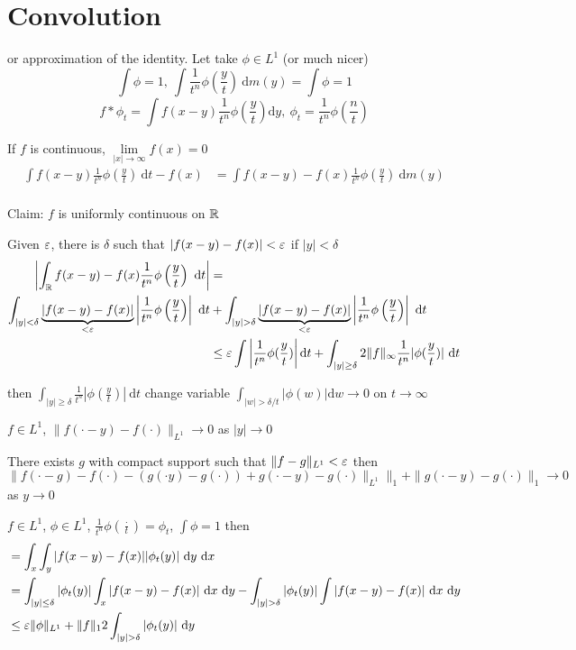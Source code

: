 \section{Convolution}
or approximation of the identity.
Let take $\phi \in L^1$ (or much nicer)
\[\int \phi = 1,\ \int \frac1{t^n}\phi\left(\frac yt\right) \ \mathrm{d}m(y) = \int \phi = 1\]
\[f * \phi_t = \int f(x-y) \frac1{t^n}\phi\left(\frac yt\right) \mathrm{d}y,\ \phi_t = \frac1{t^n} \phi\left(\frac nt\right)\]

If $f$ is continuous, $\lim\limits_{|x|\to\infty} f(x) = 0$
\begin{align*}
  \int f(x-y) \frac{1}{t^n} \phi\left(\frac yt\right) \ \mathrm{d}t - f(x) &= \int f(x-y) - f(x) \frac1{t^n} \phi\left(\frac yt\right) \ \mathrm{d}m(y) \\
\end{align*}

Claim: $f$ is uniformly continuous on $\mathbb R$

Given $\varepsilon$, there is $\delta$ such that $|f(x-y) - f(x)| < \varepsilon$ if $|y| < \delta$
\begin{align*}
  \left|\int_\mathbb R f(x-y) - f(x) \frac1{t^n} \phi\left(\frac yt\right) \ \mathrm{d}t\right| &= \\
  \int_{|y| < \delta} \underbrace{|f(x-y) - f(x)|}_{< \varepsilon} \left|\frac1{t^n} \phi\left(\frac yt\right)\right| \ \mathrm{d}t& + \int_{|y| > \delta} \underbrace{|f(x-y) - f(x)|}_{< \varepsilon} \left|\frac1{t^n} \phi\left(\frac yt\right)\right| \ \mathrm{d}t\\
  &\le \varepsilon \int \left|\frac1{t^n} \phi(\frac yt)\right| \mathrm{d}t + \int_{|y| \ge \delta} 2 \|f\|_{\infty} \frac{1}{t^n} |\phi(\frac yt)| \ \mathrm{d}t \\
\end{align*}

then $\int_{|y| \ge \delta} \frac1{t^n} |\phi(\frac yt)| \ \mathrm{d}t$ change variable
$\int_{|w| > \delta /t} |\phi(w)| \mathrm{d}w \to 0$ on $t \to \infty$

$f \in L^1$, $\|f(\cdot - y) - f(\cdot)\|_{L^1} \to 0$ as $|y| \to 0$

There exists $g$ with compact support such that $\|f-g\|_{L^1} < \varepsilon$
then 
\[\|f(\cdot - g) - f(\cdot) -(g(\cdot y) - g(\cdot)) + g(\cdot -y) - g(\cdot)\|_{L^1}\|_1 + \|g(\cdot-y)-g(\cdot)\|_1 \to 0\]
as $y\to0$

$f \in L^1$, $\phi \in L^1$, $\frac 1{t^n} \phi(\frac\cdot{t}) = \phi_t$, $\int \phi = 1$
then 
\begin{align*}
  &= \int_x\int_y |f(x-y) - f(x)||\phi_t(y)| \ \mathrm{d}y \ \mathrm{d}x \\
  &= \int_{|y| \le \delta} |\phi_t(y)| \int_x |f(x-y) - f(x)| \ \mathrm{d}x \ \mathrm{d}y - \int_{|y| > \delta} |\phi_t(y)| \int |f(x-y) - f(x)| \ \mathrm{d}x \ \mathrm{d}y \\
  &\le \varepsilon \|\phi\|_{L^1} + \|f\|_12\int_{|y| > \delta} |\phi_t(y)| \ \mathrm{d}y
\end{align*}

